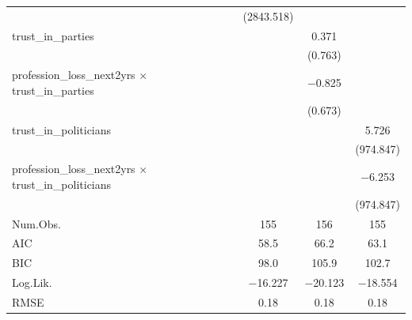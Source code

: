 \documentclass[
]{article}
\begin{document}
\begin{table}
\begin{tabular}[t]{lccc}
 & (\num{2843.518}) &  & \\
trust\_in\_parties &  & \num{0.371} & \\
 &  & (\num{0.763}) & \\
profession\_loss\_next2yrs × trust\_in\_parties &  & \num{-0.825} & \\
 &  & (\num{0.673}) & \\
trust\_in\_politicians &  &  & \num{5.726}\\
 &  &  & \vphantom{1} (\num{974.847})\\
profession\_loss\_next2yrs × trust\_in\_politicians &  &  & \num{-6.253}\\
 &  &  & (\num{974.847})\\
\midrule
Num.Obs. & \num{155} & \num{156} & \num{155}\\
AIC & \num{58.5} & \num{66.2} & \num{63.1}\\
BIC & \num{98.0} & \num{105.9} & \num{102.7}\\
Log.Lik. & \num{-16.227} & \num{-20.123} & \num{-18.554}\\
RMSE & \num{0.18} & \num{0.18} & \num{0.18}\\
\bottomrule
\end{tabular}
\end{table}
\end{document}
